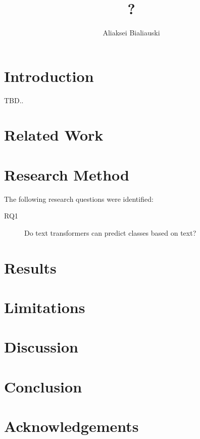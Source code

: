 \documentclass[sigplan,nonacm,review]{acmart}
\title{?}
\author{Aliaksei Bialiauski}
\affiliation{
    \institution{?}
    \city{Minsk}
    \country{Belarus}
}
\begin{document}
    \maketitle


    \section{Introduction}\label{sec:introduction}
    TBD..


    \section{Related Work}\label{sec:related}


    \section{Research Method}\label{sec:method}
    The following research questions were identified:
    \begin{description}
        \item[RQ1] Do text transformers can predict classes based on text?
    \end{description}


    \section{Results}\label{sec:results}



    \section{Limitations}\label{sec:limitations}


    \section{Discussion}\label{sec:discussion}


    \section{Conclusion}\label{sec:conclusion}


    \section{Acknowledgements}\label{sec:acks}

    
    \cite{testCitation}
    
\end{document}
